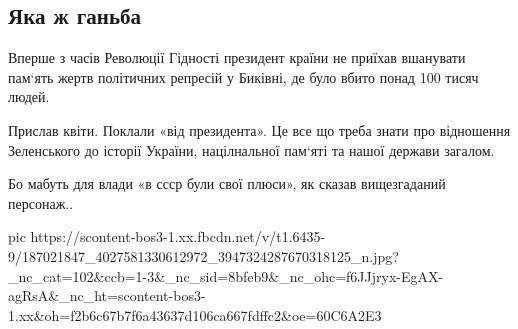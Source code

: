  
 
 
 
 
\subsection{Яка ж ганьба}

Вперше з часів Революції Гідності президент країни не приїхав вшанувати пам‘ять
жертв політичних репресій у Биківні, де було вбито понад 100 тисяч людей. 

Прислав квіти. Поклали «від президента». Це все що треба знати про відношення
Зеленського до історії України, націлнальної пам‘яті та нашої держави загалом. 

Бо мабуть для влади «в ссср були свої плюси», як сказав вищезгаданий персонаж..

\ifcmt
  pic https://scontent-bos3-1.xx.fbcdn.net/v/t1.6435-9/187021847_4027581330612972_3947324287670318125_n.jpg?_nc_cat=102&ccb=1-3&_nc_sid=8bfeb9&_nc_ohc=f6JJjryx-EgAX-agRsA&_nc_ht=scontent-bos3-1.xx&oh=f2b6c67b7f6a43637d106ca667fdffc2&oe=60C6A2E3
\fi


